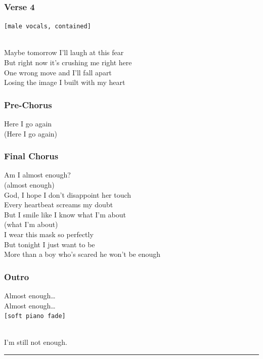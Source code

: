 \subsubsection{Verse 4}\label{verse-4-14}

\texttt{{[}male\ vocals,\ contained{]}}\strut \\
Maybe tomorrow I'll laugh at this fear\\
But right now it's crushing me right here\\
One wrong move and I'll fall apart\\
Losing the image I built with my heart

\subsubsection{Pre-Chorus}\label{pre-chorus-59}

Here I go again\\
(Here I go again)

\subsubsection{Final Chorus}\label{final-chorus-2}

Am I almost enough?\\
(almost enough)\\
God, I hope I don't disappoint her touch\\
Every heartbeat screams my doubt\\
But I smile like I know what I'm about\\
(what I'm about)\\
I wear this mask so perfectly\\
But tonight I just want to be\\
More than a boy who's scared he won't be enough

\subsubsection{Outro}\label{outro-9}

Almost enough\ldots{}\\
Almost enough\ldots{}\\
\texttt{{[}soft\ piano\ fade{]}}\strut \\
I'm still not enough.

\begin{center}\rule{0.5\linewidth}{0.5pt}\end{center}

